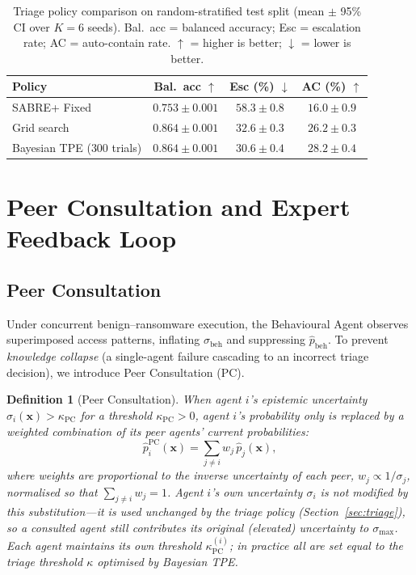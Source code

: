 \documentclass[journal]{IEEEtran}
\newtheorem{definition}{Definition}
\begin{document}
\begin{table}[t]
\centering
\footnotesize
\caption{Triage policy comparison on random-stratified test split
  (mean $\pm$ 95\% CI over $K{=}6$ seeds).
  Bal.~acc = balanced accuracy;
  Esc = escalation rate;
  AC = auto-contain rate.
  $\uparrow$ = higher is better; $\downarrow$ = lower is better.
}
\label{tab:policy_compare}
\setlength{\tabcolsep}{5pt}
\begin{tabular}{lccc}
\toprule
Policy & Bal.~acc $\uparrow$ & Esc (\%) $\downarrow$ & AC (\%) $\uparrow$ \\
\midrule
SABRE+ Fixed~\cite{kabuye2026sabre}
  & $0.753 \pm 0.001$ & $58.3 \pm 0.8$ & $16.0 \pm 0.9$ \\
Grid search
  & $0.864 \pm 0.001$ & $32.6 \pm 0.3$ & $26.2 \pm 0.3$ \\
Bayesian TPE ($300$ trials)
  & $0.864 \pm 0.001$
  & $\mathbf{30.6 \pm 0.4}$
  & $\mathbf{28.2 \pm 0.4}$ \\
\bottomrule
\end{tabular}
\end{table}

\section{Peer Consultation and Expert Feedback Loop}\label{sec:feedback}

\subsection{Peer Consultation}

Under concurrent benign--ransomware execution, the Behavioural Agent observes
superimposed access patterns, inflating $\sigma_{\text{beh}}$ and
suppressing $\hat{p}_{\text{beh}}$. To prevent \emph{knowledge collapse}
(a single-agent failure cascading to an incorrect triage decision), we
introduce Peer Consultation (PC).

\begin{definition}[Peer Consultation]\label{def:pc}
When agent $i$'s epistemic uncertainty $\sigma_i(\mathbf{x}) > \kappa_{\text{PC}}$
for a threshold $\kappa_{\text{PC}} > 0$, agent $i$'s \emph{probability only}
is replaced by a weighted combination of its peer agents' current
probabilities:
\begin{equation}\label{eq:peer_consultation}
  \hat{p}_{i}^{\text{PC}}(\mathbf{x}) =
    \sum_{j \neq i} w_j\,\hat{p}_{j}(\mathbf{x}),
\end{equation}
where weights are proportional to the inverse uncertainty of each peer,
$w_j \propto 1/\sigma_j$, normalised so that $\sum_{j \neq i} w_j = 1$.
Agent $i$'s own uncertainty $\sigma_i$ is \emph{not} modified by this
substitution---it is used unchanged by the triage policy
(Section~\ref{sec:triage}), so a consulted agent still contributes its
original (elevated) uncertainty to $\sigma_{\max}$. Each agent maintains
its own threshold $\kappa_{\text{PC}}^{(i)}$; in practice all are set equal
to the triage threshold $\kappa$ optimised by Bayesian TPE.
\end{definition}
\end{document}
